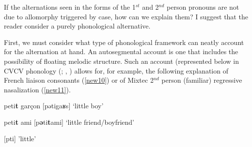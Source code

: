 \documentclass[output=paper,colorlinks,citecolor=brown,
]{langscibook}
\begin{document}
If the alternations seen in the forms of the 1$^{st}$ and 2$^{nd}$ person pronouns are not due to allomorphy triggered by case, how can we explain them? I suggest that the reader consider a purely phonological alternative. 

First, we must consider what type of phonological framework can neatly account for the alternation at hand. An autosegmental account is one that includes the possibility of floating melodic structure. Such an account (represented below in CVCV phonology (\citealt{lowenstamm1996cv}; \citealt{scheer2004lateral}, \citeyear{scheer2009external}) allows for, for example, the following explanation of French liaison consonants (\ref{new10}) or of Mixtec 2$^{nd}$ person (familiar) regressive nasalization (\ref{new11}).

\begin{exe}
\ex \label{new10}
\begin{xlist}
\ex \label{new10a}
peti\textbf{t} garçon \hspace{2cm}	[pətigaʁs\textbf{}]	\hspace{1.25cm}	‘little boy’ 

\ex \label{new10b}
peti\textbf{t} ami	\hspace{2.55cm}    [p\textbf{ə}ti\textbf{t}ami]       \hspace{1.5cm}	‘little friend/boyfriend’

\ex \label{new10c}
\hspace{4cm} [p{\textschwa}ti]  \hspace{2.25cm} 'little' \\
{
} 

\end{xlist}
\end{exe}
\end{document}
